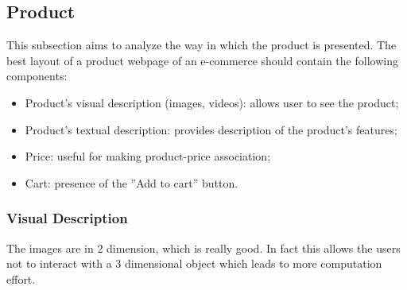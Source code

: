\subsection{Product}
This subsection aims to analyze the way in which the product is presented.
The best layout of a product webpage of an e-commerce should contain the following components:
\begin{itemize}
    \item Product's visual description (images, videos): allows user to see the product;
    \item Product's textual description: provides description of the product's features;
    \item Price: useful for making product-price association;
    \item Cart: presence of the ”Add to cart” button.
\end{itemize}

\subsubsection{Visual Description}
The images are in 2 dimension, which is really good. In fact this allows the users not
to interact with a 3 dimensional object which leads to more computation effort.

